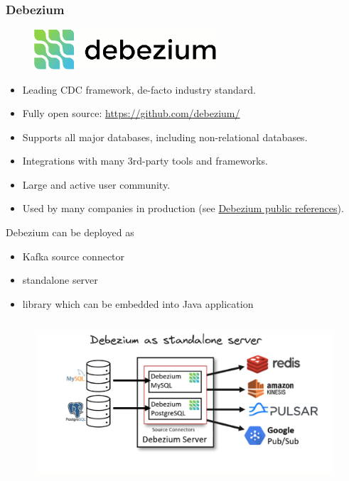 \documentclass[10pt,utf8]{beamer}
\begin{document}
\begin{frame}
   \frametitle{Debezium}
   \begin{figure}
        \centering
        \includegraphics[height=1.5cm]{./img/debezium.eps}
    \end{figure}
    
    \vspace{0.5cm}
    
   \begin{itemize}
     \item Leading CDC framework, de-facto industry standard.
     \item Fully open source: \textcolor{blue}{\url{https://github.com/debezium/}}
     \item Supports all major databases, including non-relational databases.
     \item Integrations with many 3rd-party tools and frameworks.
     \item Large and active user community.
     \item Used by many companies in production (see \textcolor{blue}{\href{https://debezium.io/community/users/}{Debezium public references}}).
   \end{itemize}
\end{frame}

\begin{frame}
    Debezium can be deployed as
    \begin{itemize}
        \item Kafka source connector
        \item standalone server
        \item library which can be embedded into Java application
    \end{itemize}
    
    \begin{figure}
        \centering
        \includegraphics[height=6cm]{./img/debezium_server.eps}
    \end{figure}
\end{frame}
\end{document}
